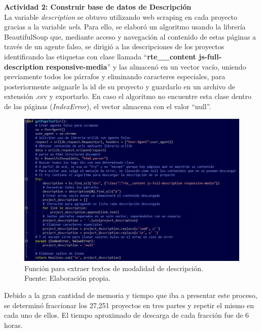 \newpage
\textbf{Actividad 2: Construir base de datos de Descripción}
\\
La variable \textit{description} se obtuvo utilizando web scraping en cada proyecto gracias a la variable \textit{urls}. Para ello, se elaboró un algoritmo usando la librería BeautifulSoup que, mediante acceso y navegación al contenido de estas páginas a través de un agente falso, se dirigió a las descripciones de los proyectos identificando las etiquetas con clase llamada “\textbf{rte\_\_content js-full-description responsive-media}” y las almacenó en un vector vacío, uniendo previamente todos los párrafos y eliminando caracteres especiales, para posteriormente asignarle la id de su proyecto y guardarlo en un archivo de extensión .csv y exportarlo. En caso el algoritmo no encuentre esta clase dentro de las páginas (\textit{IndexError}), el vector almacena con el valor “null”.

\begin{figure}[!ht]
	\begin{center}
		\includegraphics[width=1\textwidth]{4/figures/description_scraping.jpg}
		\caption[Función para extraer textos de modalidad de descripción]{Función para extraer textos de modalidad de descripción.\\
			Fuente: Elaboración propia.}
		\label{4:fig5}
	\end{center}
\end{figure}

Debido a la gran cantidad de memoria y tiempo que iba a presentar este proceso, se determinó fraccionar los 27,251 proyectos en tres partes y repetir el mismo en cada uno de ellos. El tiempo aproximado de descarga de cada fracción fue de 6 horas.

